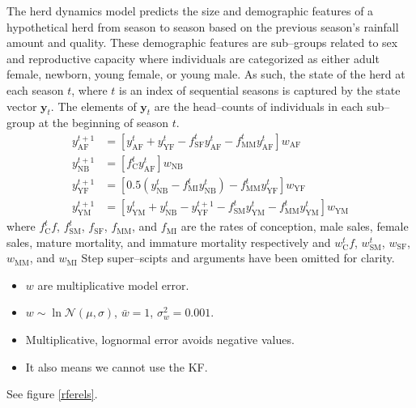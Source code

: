 \documentclass[fleqn, letterpaper]{amsart}
\newcommand{\vecy}{\mathbf{y}}
\begin{document}
The herd dynamics model predicts the size and demographic features of a hypothetical herd from season to season based on the previous season's rainfall amount and quality.
These demographic features are sub--groups related to sex and reproductive capacity where individuals are categorized as either adult female, newborn, young female, or young male.
As such, the state of the herd at each season $t$, where $t$ is an index of sequential seasons is captured by the state vector $\vecy_t$.
The elements of $\vecy_t$ are the head--counts of individuals in each sub--group at the beginning of season $t$.
\begin{align}
y_{\text{AF}}^{t+1} &= [y_{\text{AF}}^t + y_{\text{YF}}^t - f_{\text{SF}}^ty_{\text{AF}}^t - f_{\text{MM}}^ty_{\text{AF}}^t]w_{\text{AF}}\\
y_{\text{NB}}^{t+1} &= [f_{\text{C}}^ty_{\text{AF}}^t]w_{\text{NB}}\\
y_{\text{YF}}^{t+1} &= [0.5(y_{\text{NB}}^t - f_{\text{MI}}^ty_{\text{NB}}^t) - f_{\text{MM}}^ty_{\text{YF}}^t]w_{\text{YF}}\\
y_{\text{YM}}^{t+1} &= [y_{\text{YM}}^t + y_{\text{NB}}^t - y_{\text{YF}}^{t+1} - f_{\text{SM}}^ty_{\text{YM}}^t - f_{\text{MM}}^ty_{\text{YM}}^t]w_{\text{YM}}
\end{align}
where $f_{\text{C}}^tf$, $f_{\text{SM}}^t$, $f_{\text{SF}}$, $f_{\text{MM}}$, and $f_{\text{MI}}$ are the rates of conception, male sales, female sales, mature mortality, and immature mortality respectively and
$w_{\text{C}}^tf$, $w_{\text{SM}}^t$, $w_{\text{SF}}$, $w_{\text{MM}}$, and $w_{\text{MI}}$
Step super--scipts and arguments have been omitted for clarity.
\begin{itemize}
\item $w$ are multiplicative model error.
\item $w\sim\ln\mathcal{N}(\mu,\sigma)$, $\bar{w}=1$, $\sigma_w^2 = 0.001$.
\item Multiplicative, lognormal error avoids negative values.
\item It also means we cannot use the KF.
\end{itemize}
See figure \ref{rferels}.
\end{document}
